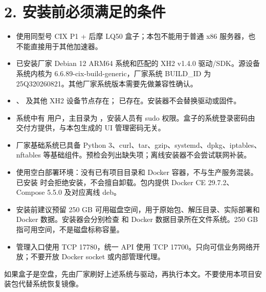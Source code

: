 \documentclass[UTF8,a4paper,zihao=-4,fontset=windows]{ctexart}
\begin{document}
\section*{2. 安装前必须满足的条件}
\begin{itemize}
\item 使用同型号 CIX P1 + 后摩 LQ50 盒子；本包不能用于普通 x86 服务器，也不能直接用于其他加速器。
\item 已安装厂家 Debian 12 ARM64 系统和匹配的 XH2 v1.4.0 驱动/SDK。源设备系统内核为 6.6.89-cix-build-generic，厂家系统 BUILD\_ID 为 25Q320260821。其他厂家系统版本需要先做兼容性确认。
\item {}、 及其他 XH2 设备节点存在； 已存在。安装器不会替换驱动或固件。
\item 系统中有  用户，主目录为 ，安装人员有 sudo 权限。盒子的系统登录密码由交付方提供，与本包生成的 UI 管理密码无关。
\item 厂家基础系统已具备 Python 3、curl、tar、gzip、systemd、dpkg、iptables、nftables 等基础组件。预检会列出缺失项；离线安装器不会尝试联网补装。
\item 使用空白部署环境：没有已有项目目录和 Docker 容器，不与生产服务混装。已安装  时会拒绝安装，不会擅自卸载。包内提供 Docker CE 29.7.2、Compose 5.5.0 及对应离线 deb。
\item 安装前建议预留 250 GB 可用磁盘空间，用于原始包、解压目录、实际部署和 Docker 数据。安装器会分别检查  和 Docker 数据目录所在文件系统。250 GB 指可用空间，不是磁盘标称容量。
\item 管理入口使用 TCP 17780，统一 API 使用 TCP 17700。只向可信业务网络开放；不要开放 Docker socket 或内部管理代理。
\end{itemize}
如果盒子是空盘，先由厂家刷好上述系统与驱动，再执行本文。不要使用本项目安装包代替系统恢复镜像。\par
\end{document}
